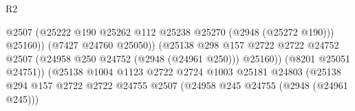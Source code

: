\begin{lexlean}{R2}
\begin{coremodule}
                                                                @2507
                                                                (@25222
                                                                  @190
                                                                  @25262
                                                                  @112
                                                                  @25238
                                                                  @25270
                                                                  (@2948 (@25272 @190)))
                                                                @25160))
                                                            (@7427 @24760 @25050))
                                                          (@25138
                                                            @298
                                                            @157
                                                            @2722
                                                            @2722
                                                            @24752
                                                            @2507
                                                            (@24958
                                                              @250
                                                              @24752
                                                              (@2948 (@24961 @250)))
                                                            @25160))
                                                        (@8201 @25051 @24751))
                                                      (@25138
                                                        @1004
                                                        @1123
                                                        @2722
                                                        @2724
                                                        @1003
                                                        @25181
                                                        @24803
                                                        (@25138
                                                          @294
                                                          @157
                                                          @2722
                                                          @2722
                                                          @24755
                                                          @2507
                                                          (@24958 @245 @24755 (@2948 (@24961 @245)))

\end{coremodule}
\end{lexlean}

